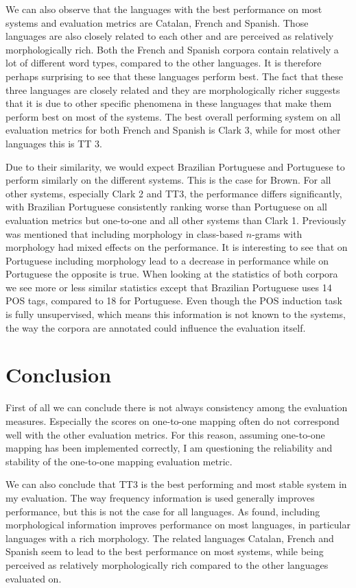 \documentclass[11pt]{article}
\begin{document}
{We can also observe that the languages with the best performance on most systems and evaluation metrics are Catalan, French and Spanish. Those languages are also closely related to each other and are perceived as relatively morphologically rich. Both the French and Spanish corpora contain relatively a lot of different word types, compared to the other languages. It is therefore perhaps surprising to see that these languages perform best. The fact that these three languages are closely related and they are morphologically richer suggests that it is due to other specific phenomena in these languages that make them perform best on most of the systems. The best overall performing system on all evaluation metrics for both French and Spanish is Clark 3, while for most other languages this is TT 3.  

Due to their similarity, we would expect Brazilian Portuguese and Portuguese to perform similarly on the different systems. This is the case for Brown. For all other systems, especially Clark 2 and TT3, the performance differs significantly, with Brazilian Portuguese consistently ranking worse than Portuguese on all evaluation metrics but one-to-one and all other systems than Clark 1. Previously was mentioned that including morphology in class-based $n$-grams with morphology had mixed effects on the performance. It is interesting to see that on Portuguese including morphology lead to a decrease in performance while on Portuguese the opposite is true. When looking at the statistics of both corpora we see more or less similar statistics except that Brazilian Portuguese uses 14 POS tags, compared to 18 for Portuguese. Even though the POS induction task is fully unsupervised, which means this information is not known to the systems, the way the corpora are annotated could influence the evaluation itself.

\section{Conclusion}\label{conclusion}
First of all we can conclude there is not always consistency among the evaluation measures. Especially the scores on one-to-one mapping often do not correspond well with the other evaluation metrics. For this reason, assuming  one-to-one mapping has been implemented correctly, I am questioning the reliability and stability of the one-to-one mapping evaluation metric. 

We can also conclude that TT3 is the best performing and most stable system in my evaluation. The way frequency information is used generally improves performance, but this is not the case for all languages. As \cite{christodoulopoulos2010} found, including morphological information improves performance on most languages, in particular languages with a rich morphology. The related languages Catalan, French and Spanish seem to lead to the best performance on most systems, while being perceived as relatively morphologically rich compared to the other languages evaluated on.

}
\end{document}
